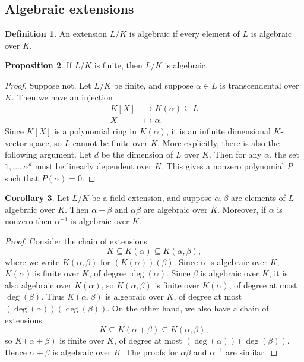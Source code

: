 \documentclass{article}
\newcommand{\rb}[1]{\left( #1 \right)}
\renewcommand{\sb}[1]{\left[ #1 \right]}
\theoremstyle{definition}\newtheorem{definition}{Definition}[subsection]
\theoremstyle{definition}\newtheorem{remark}[definition]{Remark}
\theoremstyle{definition}\newtheorem*{example}{Example}
\theoremstyle{definition}\newtheorem*{note}{Note}
\newtheorem{proposition}[definition]{Proposition}
\newtheorem{corollary}[definition]{Corollary}
\begin{document}
\subsection{Algebraic extensions}

\begin{definition}
An extension $ L / K $ is algebraic if every element of $ L $ is algebraic over $ K $.
\end{definition}

\begin{proposition}
If $ L / K $ is finite, then $ L / K $ is algebraic.
\end{proposition}

\begin{proof}
Suppose not. Let $ L / K $ be finite, and suppose $ \alpha \in L $ is transcendental over $ K $. Then we have an injection
\begin{align*}
K\sb{X} & \to K\rb{\alpha} \subseteq L \\
X & \mapsto \alpha.
\end{align*}
Since $ K\sb{X} $ is a polynomial ring in $ K\rb{\alpha} $, it is an infinite dimensional $ K $-vector space, so $ L $ cannot be finite over $ K $. More explicitly, there is also the following argument. Let $ d $ be the dimension of $ L $ over $ K $. Then for any $ \alpha $, the set $ 1, \dots, \alpha^d $ must be linearly dependent over $ K $. This gives a nonzero polynomial $ P $ such that $ P\rb{\alpha} = 0 $.
\end{proof}

\begin{corollary}
Let $ L / K $ be a field extension, and suppose $ \alpha, \beta $ are elements of $ L $ algebraic over $ K $. Then $ \alpha + \beta $ and $ \alpha\beta $ are algebraic over $ K $. Moreover, if $ \alpha $ is nonzero then $ \alpha^{-1} $ is algebraic over $ K $.
\end{corollary}

\begin{proof}
Consider the chain of extensions
$$ K \subseteq K\rb{\alpha} \subseteq K\rb{\alpha, \beta}, $$
where we write $ K\rb{\alpha, \beta} $ for $ \rb{K\rb{\alpha}}\rb{\beta} $. Since $ \alpha $ is algebraic over $ K $, $ K\rb{\alpha} $ is finite over $ K $, of degree $ \deg\rb{\alpha} $. Since $ \beta $ is algebraic over $ K $, it is also algebraic over $ K\rb{\alpha} $, so $ K\rb{\alpha, \beta} $ is finite over $ K\rb{\alpha} $, of degree at most $ \deg\rb{\beta} $. Thus $ K\rb{\alpha, \beta} $ is algebraic over $ K $, of degree at most $ \rb{\deg\rb{\alpha}}\rb{\deg\rb{\beta}} $. On the other hand, we also have a chain of extensions
$$ K \subseteq K\rb{\alpha + \beta} \subseteq K\rb{\alpha, \beta}, $$
so $ K\rb{\alpha + \beta} $ is finite over $ K $, of degree at most $ \rb{\deg\rb{\alpha}}\rb{\deg\rb{\beta}} $. Hence $ \alpha + \beta $ is algebraic over $ K $. The proofs for $ \alpha\beta $ and $ \alpha^{-1} $ are similar.
\end{proof}
\end{document}
